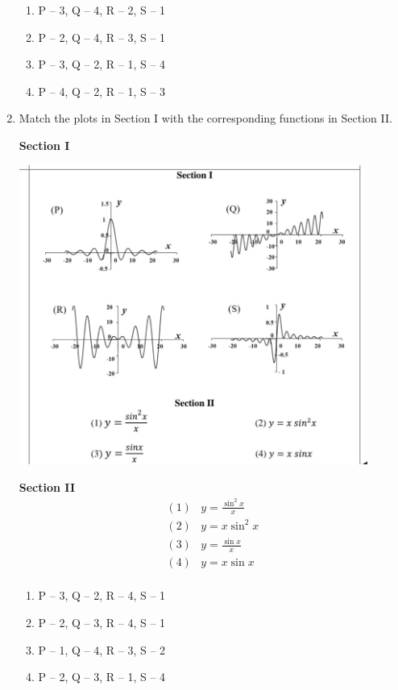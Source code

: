 \documentclass[12pt]{article}
\begin{document}
\begin{enumerate}
\begin{enumerate}[label=(\alph*)]
\item P – 3, Q – 4, R – 2, S – 1
\item P – 2, Q – 4, R – 3, S – 1
\item P – 3, Q – 2, R – 1, S – 4
\item P – 4, Q – 2, R – 1, S – 3
\end{enumerate}

\item Match the plots in Section I with the corresponding functions in Section II.

\textbf{Section I}
\begin{center}
\includegraphics[width=0.9\textwidth]{images/qqq44i.jpg}
\end{center}

\textbf{Section II}
\[
\begin{array}{ll}
(1) & y = \frac{\sin^2 x}{x} \\
(2) & y = x \sin^2 x \\
(3) & y = \frac{\sin x}{x} \\
(4) & y = x \sin x \\
\end{array}
\]

\begin{enumerate}[label=(\alph*)]
\item P – 3, Q – 2, R – 4, S – 1
\item P – 2, Q – 3, R – 4, S – 1
\item P – 1, Q – 4, R – 3, S – 2
\item P – 2, Q – 3, R – 1, S – 4
\end{enumerate}


\end{enumerate}
\end{document}
